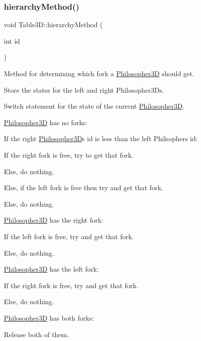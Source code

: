 \subsubsection{\texorpdfstring{hierarchy\+Method()}{hierarchyMethod()}}
{\footnotesize\ttfamily void Table3\+D\+::hierarchy\+Method (\begin{DoxyParamCaption}\item[{int}]{id }\end{DoxyParamCaption})}



Method for determining which fork a \hyperlink{class_philosopher3_d}{Philosopher3D} should get. 


\begin{DoxyItemize}
\item Store the states for the left and right Philosopher3\+Ds.
\item Switch statement for the state of the current \hyperlink{class_philosopher3_d}{Philosopher3D}.
\begin{DoxyItemize}
\item \hyperlink{class_philosopher3_d}{Philosopher3D} has no forks\+:
\begin{DoxyItemize}
\item If the right \hyperlink{class_philosopher3_d}{Philosopher3D}\textquotesingle{}s id is less than the left Philsopher\textquotesingle{}s id\+:
\begin{DoxyItemize}
\item If the right fork is free, try to get that fork.
\item Else, do nothing.
\end{DoxyItemize}
\item Else, if the left fork is free then try and get that fork.
\item Else, do nothing.
\end{DoxyItemize}
\item \hyperlink{class_philosopher3_d}{Philosopher3D} has the right fork\+:
\begin{DoxyItemize}
\item If the left fork is free, try and get that fork.
\item Else, do nothing.
\end{DoxyItemize}
\item \hyperlink{class_philosopher3_d}{Philosopher3D} has the left fork\+:
\begin{DoxyItemize}
\item If the right fork is free, try and get that fork.
\item Else, do nothing.
\end{DoxyItemize}
\item \hyperlink{class_philosopher3_d}{Philosopher3D} has both forks\+:
\begin{DoxyItemize}
\item Release both of them.
\end{DoxyItemize}
\end{DoxyItemize}
\end{DoxyItemize}
